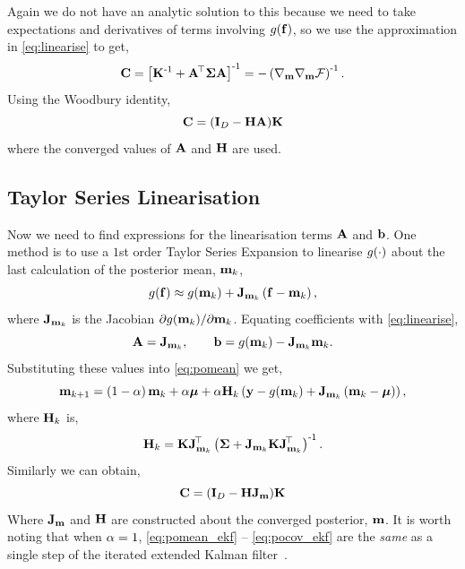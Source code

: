 \documentclass{article} %
\begin{document}
Again we do not have an analytic solution to this because we need to take
expectations and derivatives of terms involving $g\!\left({{\mathbf{f}}}\right)$, so we use
the approximation in \eqref{eq:linearise} to get,
\begin{equation}
    \mathbf{C} = \left[{\mathbf{K}^{\text{-}1} + \mathbf{A}^{\!\top}\boldsymbol{\Sigma}\mathbf{A}}\right]^{\text{-}1}
    = - \left({\nabla_{\mathbf{m}} \nabla_{\mathbf{m}} \mathcal{F}}\right)^{\text{-}1}.
\end{equation}
Using the Woodbury identity,
\begin{equation}
    \mathbf{C} = \left({\mathbf{I}_{D} - \mathbf{H}\mathbf{A}}\right)\!\mathbf{K}
    \label{eq:pocov}
\end{equation}
where the converged values of $\mathbf{A}$ and $\mathbf{H}$ are used.


\subsection{Taylor Series Linearisation}

Now we need to find expressions for the linearisation terms $\mathbf{A}$ and
$\mathbf{b}$. One method is to use a $1$st order Taylor Series Expansion to 
linearise $g\!\left({{\cdot}}\right)$ about the last calculation of the posterior mean, 
$\mathbf{m}_k$,
\begin{equation}
    g\!\left({{\mathbf{f}}}\right) \approx g\!\left({{\mathbf{m}_k}}\right) +
    \mathbf{J}_{\mathbf{m}_k}\left({\mathbf{f} - \mathbf{m}_k}\right),
\end{equation}
where $\mathbf{J}_{\mathbf{m}_k}$ is the Jacobian $\partial g\!\left({{\mathbf{m}_k}}\right)\!/ 
\partial\mathbf{m}_k$. Equating coefficients with \eqref{eq:linearise},
\begin{equation}
    \mathbf{A} = \mathbf{J}_{\mathbf{m}_k}, \qquad \mathbf{b} = g\!\left({{\mathbf{m}_k}}\right) -
    \mathbf{J}_{\mathbf{m}_k}\mathbf{m}_k.
\end{equation}
Substituting these values into \eqref{eq:pomean} we get,
\begin{equation}
    \mathbf{m}_{k+1} = \left({1-\alpha}\right)\mathbf{m}_k + \alpha\boldsymbol{\mu} 
        + \alpha\mathbf{H}_k\left({\mathbf{y} - g\!\left({{\mathbf{m}_k}}\right) 
        + \mathbf{J}_{\mathbf{m}_k}\left({\mathbf{m}_k - \boldsymbol{\mu}}\right)}\right),
    \label{eq:pomean_ekf}
\end{equation}
where $\mathbf{H}_k$ is,
\begin{equation}
    \mathbf{H}_k = \mathbf{K}\mathbf{J}_{\mathbf{m}_k}^{\!\top}\left({\boldsymbol{\Sigma} +
        \mathbf{J}_{\mathbf{m}_k}\mathbf{K}\mathbf{J}_{\mathbf{m}_k}^{\!\top}}\right)^{\text{-}1}.
\end{equation}
Similarly we can obtain,
\begin{equation}
    \mathbf{C} = \left({\mathbf{I}_{D} - \mathbf{H}\mathbf{J}_{\mathbf{m}}}\right)\!\mathbf{K}
    \label{eq:pocov_ekf}
\end{equation}
Where $\mathbf{J}_{\mathbf{m}}$ and $\mathbf{H}$ are constructed about the converged
posterior, $\mathbf{m}$. It is worth noting that when $\alpha = 1$,
\eqref{eq:pomean_ekf} -- \eqref{eq:pocov_ekf} are the \emph{same} as a single
step of the iterated extended Kalman filter~\cite{Bell1993, Sibley2006}.
\end{document}
